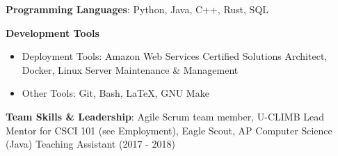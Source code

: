 \vspace{-2.0mm}


\begin{cventries}
\vspace{-5mm}
  \cventry
    {}
    {}
    {}
    {}
    {
      \begin{cvitems}
        \item {\textbf{Programming Languages}: Python, Java, C++,
        Rust, SQL}
        \item {\textbf{Development Tools}}
        \begin{itemize}
        \item {Deployment Tools: Amazon Web Services
            Certified Solutions Architect, Docker, Linux Server Maintenance \& Management}
        \item {Other Tools: Git, Bash, \LaTeX, GNU Make}
        \end {itemize}
        \item {\textbf{Team Skills \& Leadership}: Agile Scrum team
            member, U-CLIMB Lead Mentor for CSCI 101 (see Employment),
    Eagle Scout, AP Computer Science (Java) Teaching Assistant (2017 -
    2018)}
      \end{cvitems}
    }
\end{cventries}
